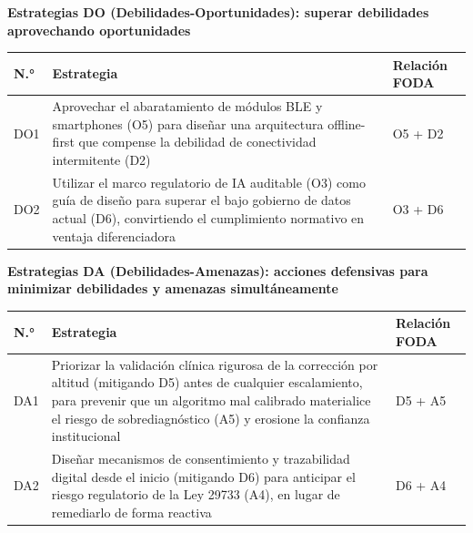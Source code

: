 \documentclass[11pt,a4paper]{article}
\begin{document}
\textbf{Estrategias DO (Debilidades-Oportunidades): superar debilidades aprovechando oportunidades}

{\small
\begin{longtable}[]{@{}
  >{\raggedright\arraybackslash}p{}
  >{\raggedright\arraybackslash}p{}
  >{\raggedright\arraybackslash}p{}@{}}
\toprule\noalign{}
\begin{minipage}[b]{\linewidth}\raggedright
N.°
\end{minipage} & \begin{minipage}[b]{\linewidth}\raggedright
Estrategia
\end{minipage} & \begin{minipage}[b]{\linewidth}\raggedright
Relación FODA
\end{minipage} \\
\midrule\noalign{}
\endhead
\bottomrule\noalign{}
\endlastfoot
DO1 & Aprovechar el abaratamiento de módulos BLE y smartphones (O5) para diseñar una arquitectura offline-first que compense la debilidad de conectividad intermitente (D2) & O5 + D2 \\
DO2 & Utilizar el marco regulatorio de IA auditable (O3) como guía de diseño para superar el bajo gobierno de datos actual (D6), convirtiendo el cumplimiento normativo en ventaja diferenciadora & O3 + D6 \\
\end{longtable}
}

\textbf{Estrategias DA (Debilidades-Amenazas): acciones defensivas para minimizar debilidades y amenazas simultáneamente}

{\small
\begin{longtable}[]{@{}
  >{\raggedright\arraybackslash}p{}
  >{\raggedright\arraybackslash}p{}
  >{\raggedright\arraybackslash}p{}@{}}
\toprule\noalign{}
\begin{minipage}[b]{\linewidth}\raggedright
N.°
\end{minipage} & \begin{minipage}[b]{\linewidth}\raggedright
Estrategia
\end{minipage} & \begin{minipage}[b]{\linewidth}\raggedright
Relación FODA
\end{minipage} \\
\midrule\noalign{}
\endhead
\bottomrule\noalign{}
\endlastfoot
DA1 & Priorizar la validación clínica rigurosa de la corrección por altitud (mitigando D5) antes de cualquier escalamiento, para prevenir que un algoritmo mal calibrado materialice el riesgo de sobrediagnóstico (A5) y erosione la confianza institucional & D5 + A5 \\
DA2 & Diseñar mecanismos de consentimiento y trazabilidad digital desde el inicio (mitigando D6) para anticipar el riesgo regulatorio de la Ley 29733 (A4), en lugar de remediarlo de forma reactiva & D6 + A4 \\
\end{longtable}
}
\end{document}
